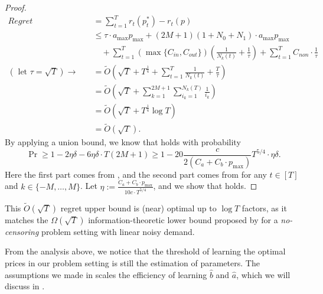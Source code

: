 \begin{proof}
\begin{equation}
    \label{eq:total_regret_sketch}
    \begin{aligned}
        Regret&=\sum_{t=1}^T r_t(p_t^*) - r_t(p)\\
        &\leq \tau\cdot a_{\max} p_{\max} + (2M+1)(1+N_0+N_1)\cdot a_{\max} p_{\max}\\
        &\quad + \sum_{t=1}^T (\max\{C_{in}, C_{out}\})(\frac1{N_k(t)} + \frac1{\tau}) +\sum_{t=1}^T C_{non}\cdot\frac1{\tau}\\
        (\text{ let }\tau=\sqrt{T})\rightarrow\quad&=\tilde{O}(\sqrt{T} + T^{\frac14} + \sum_{t=1}^T\frac1{N_{k}(t)} + \frac{T}{\tau})\\
        &=\tilde{O}(\sqrt{T} + \sum_{k=1}^{2M+1}\sum_{i_k=1}^{N_k(T)}\frac1{i_k})\\
        &=\tilde{O}(\sqrt{T} + T^{\frac14}\log T)\\
        &=\tilde{O}(\sqrt{T}).
    \end{aligned}
\end{equation}
By applying a union bound, we know that  holds with probability $$\Pr\geq 1-2\eta\delta - 6\eta\delta\cdot T(2M+1) \geq 1- 20\frac{c}{2(C_a+C_b\cdot p_{\max})}T^{5/4}\cdot \eta\delta.$$
Here the first part comes from , and the second part comes from  for any $t\in[T]$ and $k\in\{-M, \ldots, M\}$. Let $\eta:=\frac{C_a + C_b\cdot p_{\max}}{10c\cdot T^{5/4}}$, and we show that  holds.
\end{proof}
\begin{remark}
    This $\tilde{O}(\sqrt{T})$ regret upper bound is (near) optimal up to $\log{T}$ factors, as it matches the $\Omega(\sqrt{T})$ information-theoretic lower bound proposed by \citet{broder2012dynamic} for a \emph{no-censoring} problem setting with linear noisy demand.
\end{remark}

From the analysis above, we notice that the threshold of learning the optimal prices in our problem setting is still the estimation of parameters. The assumptions we made in  scales the efficiency of learning $\hat b$ and $\hat a$, which we will discuss in .